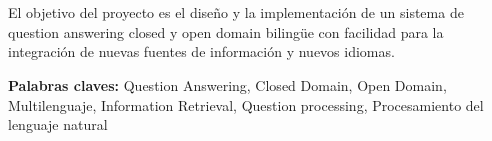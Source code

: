 \chapter*{\runtitulo}

\noindent El objetivo del proyecto es el diseño y la implementación de un sistema de question answering closed y open domain bilingüe con facilidad para la integración de nuevas fuentes de información y nuevos idiomas.
\bigskip

\noindent\textbf{Palabras claves:} Question Answering, Closed Domain, Open Domain, Multilenguaje, Information Retrieval, Question processing, Procesamiento del lenguaje natural
